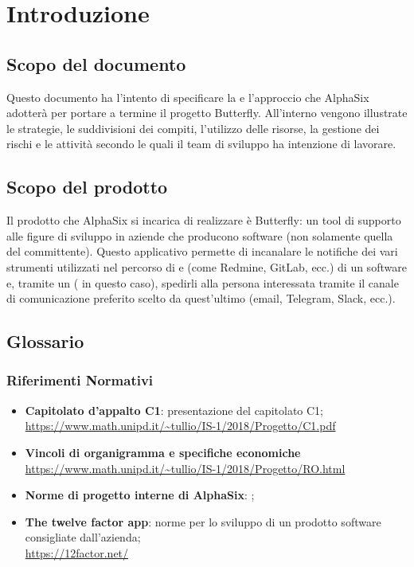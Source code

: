 \newpage
\section{Introduzione} \label{Introduzione}
	
	\subsection{Scopo del documento}
	Questo documento ha l'intento di specificare la  e l'approccio che AlphaSix adotterà per portare a termine il progetto Butterfly.
	All'interno vengono illustrate le strategie, le suddivisioni dei compiti, l'utilizzo delle risorse, la gestione dei rischi e le attività secondo le quali il team di sviluppo ha intenzione di lavorare.
	
	\subsection{Scopo del prodotto}	
	Il prodotto che AlphaSix si incarica di realizzare è Butterfly: un tool di supporto alle figure di sviluppo in aziende che producono software (non solamente quella del committente).
	Questo applicativo permette di incanalare le notifiche dei vari strumenti utilizzati nel percorso di  e  (come Redmine, GitLab, ecc.) di un software e, tramite un  ( in questo caso), spedirli alla persona interessata tramite il canale di comunicazione
	preferito scelto da quest'ultimo (email, Telegram, Slack, ecc.).
	
	\subsection{Glossario}
		\subsubsection{Riferimenti Normativi}
			\begin{itemize}
				\item \textbf{Capitolato d'appalto C1}: presentazione del capitolato C1;\\
				\url{https://www.math.unipd.it/~tullio/IS-1/2018/Progetto/C1.pdf}
				\item \textbf{Vincoli di organigramma e specifiche economiche}\\
				\url{https://www.math.unipd.it/~tullio/IS-1/2018/Progetto/RO.html}
				\item \textbf{Norme di progetto interne di AlphaSix}: \NdPv;
				\item \textbf{The twelve factor app}: norme per lo sviluppo di un prodotto software consigliate dall'azienda;\\
				\url{https://12factor.net/}
			\end{itemize}
		
